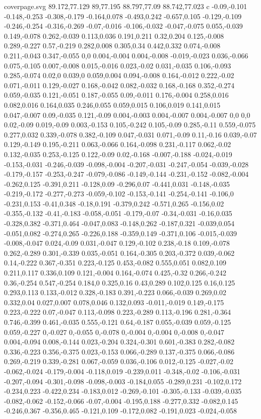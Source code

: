 \begin{filecontents}[noheader]{coverpage.svg}
89.172,77.129 89,77.195 88.797,77.09 88.742,77.023 c -0.09,-0.101 -0.148,-0.253 -0.308,-0.179 -0.164,0.078 -0.493,0.242 -0.657,0.105 -0.129,-0.109 -0.246,-0.254 -0.316,-0.269 -0.07,-0.016 -0.106,-0.032 -0.047,-0.075 0.055,-0.039 0.149,-0.078 0.262,-0.039 0.113,0.036 0.191,0.211 0.32,0.204 0.125,-0.008 0.289,-0.227 0.57,-0.219 0.282,0.008 0.305,0.34 0.442,0.332 0.074,-0.008 0.211,-0.043 0.347,-0.055 0,0 0.004,-0.004 0.004,-0.008 -0.019,-0.023 0.036,-0.066 0.075,-0.105 0.007,-0.008 0.015,-0.016 0.023,-0.02 0.031,-0.035 0.106,-0.093 0.285,-0.074 0.02,0 0.039,0 0.059,0.004 0.094,-0.008 0.164,-0.012 0.222,-0.02 0.071,-0.011 0.129,-0.027 0.168,-0.042 0.082,-0.032 0.168,-0.168 0.352,-0.274 0.059,-0.035 0.121,-0.051 0.187,-0.055 0.09,-0.011 0.176,-0.004 0.258,0.016 0.082,0.016 0.164,0.035 0.246,0.055 0.059,0.015 0.106,0.019 0.141,0.015 0.047,-0.007 0.09,-0.035 0.121,-0.09 0.004,-0.003 0.004,-0.007 0.004,-0.007 0,0 0,0 0.02,-0.09 0.019,-0.09 0.003,-0.153 0.105,-0.242 0.105,-0.09 0.285,-0.11 0.559,-0.075 0.277,0.032 0.339,-0.078 0.382,-0.109 0.047,-0.031 0.071,-0.09 0.11,-0.16 0.039,-0.07 0.129,-0.149 0.195,-0.211 0.063,-0.066 0.164,-0.098 0.231,-0.117 0.062,-0.02 0.132,-0.035 0.253,-0.125 0.122,-0.09 0.02,-0.168 -0.007,-0.188 -0.024,-0.019 -0.153,-0.031 -0.246,-0.039 -0.098,-0.004 -0.207,-0.031 -0.247,-0.054 -0.039,-0.028 -0.179,-0.157 -0.253,-0.247 -0.079,-0.086 -0.149,-0.144 -0.231,-0.152 -0.082,-0.004 -0.262,0.125 -0.391,0.211 -0.128,0.09 -0.296,0.07 -0.441,0.031 -0.148,-0.035 -0.219,-0.172 -0.277,-0.273 -0.059,-0.102 -0.153,-0.141 -0.254,-0.141 -0.106,0 -0.231,0.153 -0.41,0.348 -0.18,0.191 -0.379,0.242 -0.571,0.265 -0.156,0.02 -0.355,-0.132 -0.41,-0.183 -0.058,-0.051 -0.179,-0.07 -0.34,-0.031 -0.16,0.035 -0.328,0.382 -0.371,0.464 -0.047,0.083 -0.148,0.262 -0.187,0.321 -0.039,0.054 -0.051,0.082 -0.274,0.265 -0.226,0.188 -0.359,0.149 -0.371,0.106 -0.015,-0.039 -0.008,-0.047 0.024,-0.09 0.031,-0.047 0.129,-0.102 0.238,-0.18 0.109,-0.078 0.262,-0.289 0.301,-0.339 0.035,-0.051 0.164,-0.305 0.203,-0.372 0.039,-0.062 0.14,-0.222 0.367,-0.351 0.223,-0.125 0.453,-0.082 0.555,0.051 0.082,0.109 0.211,0.117 0.336,0.109 0.121,-0.004 0.164,-0.074 0.425,-0.32 0.266,-0.242 0.36,-0.254 0.547,-0.254 0.184,0 0.325,0.16 0.43,0.289 0.102,0.125 0.16,0.125 0.293,0.113 0.133,-0.012 0.328,-0.183 0.391,-0.223 0.066,-0.039 0.269,0.02 0.332,0.04 0.027,0.007 0.078,0.046 0.132,0.093 -0.011,-0.019 0.149,-0.175 0.223,-0.222 0.07,-0.047 0.113,-0.098 0.223,-0.289 0.113,-0.196 0.281,-0.364 0.746,-0.399 0.461,-0.035 0.555,-0.121 0.64,-0.187 0.055,-0.039 0.059,-0.125 0.059,-0.227 0,-0.027 0,-0.055 0,-0.078 0,-0.004 0,-0.004 0,-0.008 0,-0.047 0.004,-0.094 0.008,-0.144 0.023,-0.204 0.324,-0.301 0.601,-0.383 0.282,-0.082 0.336,-0.223 0.356,-0.375 0.023,-0.153 0.066,-0.289 0.137,-0.375 0.066,-0.086 0.269,-0.219 0.339,-0.281 0.067,-0.059 0.036,-0.106 0.012,-0.125 -0.027,-0.02 -0.062,-0.024 -0.179,-0.004 -0.118,0.019 -0.239,0.011 -0.348,-0.02 -0.106,-0.031 -0.207,-0.094 -0.301,-0.098 -0.098,-0.003 -0.184,0.055 -0.289,0.231 -0.102,0.172 -0.234,0.223 -0.422,0.234 -0.183,0.012 -0.269,-0.101 -0.305,-0.133 -0.039,-0.035 -0.082,-0.062 -0.152,-0.066 -0.07,-0.004 -0.195,0.188 -0.277,0.332 -0.082,0.145 -0.246,0.367 -0.356,0.465 -0.121,0.109 -0.172,0.082 -0.191,0.023 -0.024,-0.058 
\end{filecontents}
